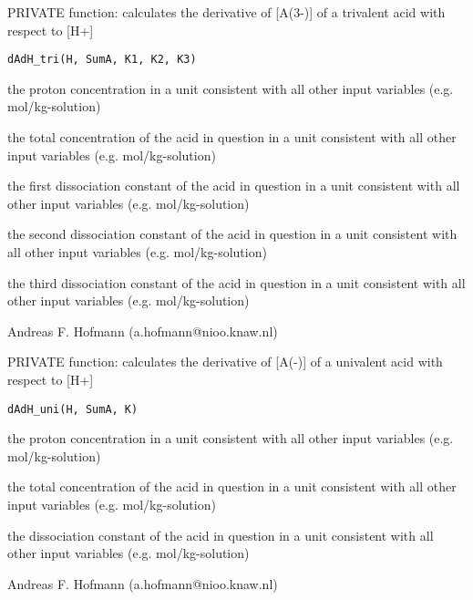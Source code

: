 \documentclass{article}
\begin{document}
\begin{Description}\relax
PRIVATE function: calculates the derivative of [A(3-)] of a trivalent acid with respect to [H+]
\end{Description}
\begin{Usage}
\begin{verbatim}dAdH_tri(H, SumA, K1, K2, K3)\end{verbatim}
\end{Usage}
\begin{Arguments}
\begin{ldescription}
\item[\code{H }] the proton concentration in a unit consistent with all other input variables (e.g. mol/kg-solution)
\item[\code{SumA }] the total concentration of the acid in question in a unit consistent with all other input variables (e.g. mol/kg-solution)
\item[\code{K1 }] the first dissociation constant of the acid in question in a unit consistent with all other input variables (e.g. mol/kg-solution)
\item[\code{K2 }] the second dissociation constant of the acid in question in a unit consistent with all other input variables (e.g. mol/kg-solution)
\item[\code{K3 }] the third dissociation constant of the acid in question in a unit consistent with all other input variables (e.g. mol/kg-solution)
\end{ldescription}
\end{Arguments}
\begin{Author}\relax
Andreas F. Hofmann (a.hofmann@nioo.knaw.nl)
\end{Author}

\begin{Description}\relax
PRIVATE function: calculates the derivative of [A(-)] of a univalent acid with respect to [H+]
\end{Description}
\begin{Usage}
\begin{verbatim}dAdH_uni(H, SumA, K)\end{verbatim}
\end{Usage}
\begin{Arguments}
\begin{ldescription}
\item[\code{H }] the proton concentration in a unit consistent with all other input variables (e.g. mol/kg-solution)
\item[\code{SumA }] the total concentration of the acid in question in a unit consistent with all other input variables (e.g. mol/kg-solution)
\item[\code{K }] the dissociation constant of the acid in question in a unit consistent with all other input variables (e.g. mol/kg-solution)
\end{ldescription}
\end{Arguments}
\begin{Author}\relax
Andreas F. Hofmann (a.hofmann@nioo.knaw.nl)
\end{Author}
\end{document}
